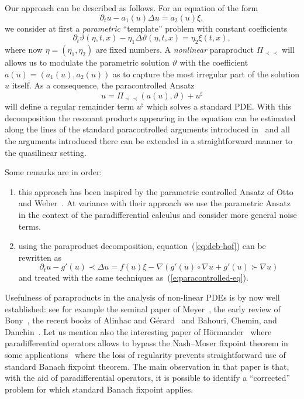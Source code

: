 \documentclass[11pt,reqno]{amsart}
\newcommand{\precprec}{\prec\!\!\!\prec}
\newcommand{\tmtextit}[1]{{\itshape{#1}}}
\newenvironment{enumeratealpha}{\begin{enumerate}[a{\textup{)}}] }{\end{enumerate}}
\begin{document}
Our approach can be described as follows. For an equation of the form
\[ \partial_t u - a_1 (u) \Delta u = a_2 (u) \xi, \]
we consider at first a \tmtextit{parametric} ``template'' problem with
constant coefficients
\begin{equation}
  \partial_t \vartheta (\eta, t, x) - \eta_1 \Delta \vartheta (\eta, t, x) =
  \eta_2 \xi (t, x), \label{eq:template}
\end{equation}
where now $\eta = (\eta_1, \eta_2)$ are fixed numbers. A \tmtextit{nonlinear}
paraproduct $\Pi_{\precprec}$ will allows us to modulate the parametric
solution $\vartheta$ with the coefficient $a (u) = (a_1 (u), a_2 (u))$ as to
capture the most irregular part of the solution $u$ itself. As a consequence,
the paracontrolled Ansatz
\[ u = \Pi_{\precprec} (a (u), \vartheta) + u^{\sharp} \]
will define a regular remainder term $u^{\sharp}$ which solves a standard PDE.
With this decomposition the resonant products appearing in the equation can be
estimated along the lines of the standard paracontrolled arguments introduced
in~{\cite{gubinelli_paracontrolled_2015}} and all the arguments introduced
there can be extended in a straightforward manner to the quasilinear setting.

Some remarks are in order:
\begin{enumeratealpha}
  \item this approach has been inspired by the parametric controlled Ansatz of
  Otto and Weber~{\cite{otto_quasilinear_2016}}. At variance with their
  approach we use the parametric Ansatz in the context of the paradifferential
  calculus and consider more general noise terms.
  
  \item using the paraproduct decomposition, equation~(\ref{eq:deb-hof}) can
  be rewritten as
  \[ \partial_t u - g' (u) \prec \Delta u = f (u) \xi - \nabla (g' (u) \circ
     \nabla u + g' (u) \succ \nabla u) \]
  and treated with the same techniques as~(\ref{e:paracontrolled-eq}).
\end{enumeratealpha}


Usefulness of paraproducts in the analysis of non-linear PDEs is by now well
established: see for example the seminal paper of
Meyer~{\cite{meyer_remarques_1981}}, the early review of
Bony~{\cite{bony_microlocal_1991}}, the recent books of Alinhac and
G{\'e}rard~{\cite{alinhac_operateurs_1991}} and Bahouri, Chemin, and
Danchin~{\cite{bahouri_fourier_2011}}. Let us mention also the interesting
paper of H{\"o}rmander~{\cite{hormander_nash_moser_1990}} where
paradifferential operators allows to bypass the Nash--Moser fixpoint theorem
in some applications \ where the loss of regularity prevents straightforward
use of standard Banach fixpoint theorem. The main observation in that paper is
that, with the aid of paradifferential operators, it is possible to identify a
``corrected'' problem for which standard Banach fixpoint applies.
\end{document}
